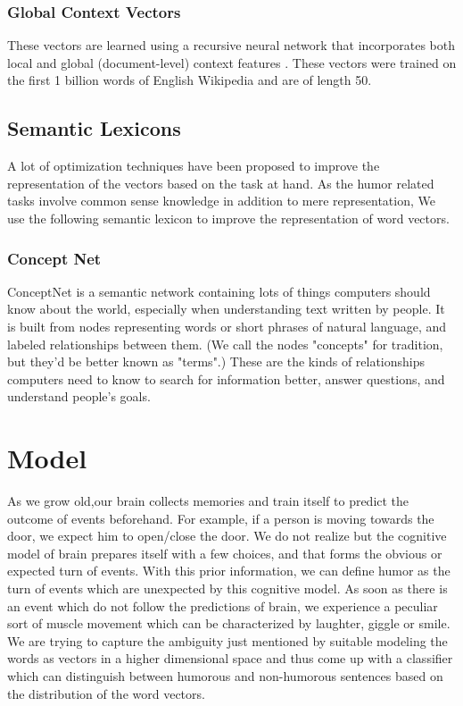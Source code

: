 \documentclass{acm_proc_article-sp}
\begin{document}
\subsubsection{Global Context Vectors}

These vectors are learned using a recursive neural network \cite{socher2011semi} that incorporates both local and global (document-level) context features \cite{maas2011learning}. These vectors were trained on the first 1 billion words of English Wikipedia and are of length 50.



\subsection{ Semantic Lexicons}

A lot of optimization techniques have been proposed to improve the representation of the vectors based on the task at hand. As the humor related tasks involve common sense knowledge in addition to mere representation, We use the following semantic lexicon to improve the representation of word vectors. 

\subsubsection{Concept Net }
ConceptNet is a semantic network containing lots of things computers should know about the world, especially when understanding text written by people.
It is built from nodes representing words or short phrases of natural language, and labeled relationships between them. (We call the nodes "concepts" for tradition, but they'd be better known as "terms".) These are the kinds of relationships computers need to know to search for information better, answer questions, and understand people's goals.

\section{Model}


As we grow old,our brain collects memories and train itself to predict the outcome of events beforehand. For example, if a person is moving towards the door, we expect him to open/close the door. We do not realize but the cognitive model of brain prepares itself with a few choices, and that forms the obvious or expected turn of events. With this prior information, we can define humor as the turn of events which are unexpected by this cognitive model. As soon as there is an event which do not follow the predictions of brain, we experience a peculiar sort of muscle movement which can be characterized by laughter, giggle or smile. We are trying to capture the ambiguity just mentioned by suitable modeling the words as vectors in a higher dimensional space and thus come up with a classifier which can distinguish between humorous and non-humorous sentences based on the distribution of the word vectors.
\end{document}
